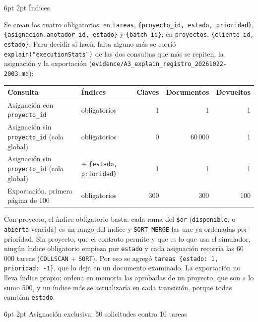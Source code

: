 \documentclass[10pt,letterpaper]{article}
\makeatletter
\newcommand{\ev}[1]{{\footnotesize\texttt{evidence/\allowbreak #1}}}
\renewcommand\subsection{\@startsection{subsection}{2}{\z@}%
  {6pt \@plus 1pt}{2pt}%
  {\normalfont\normalsize\bfseries\color{acc}}}
\makeatother
\begin{document}
\subsection{Índices}

Se crean los cuatro obligatorios: en \texttt{tareas}, \texttt{\{proyecto\_id, estado, prioridad\}},
\texttt{\{asignacion.anotador\_id, estado\}} y \texttt{\{batch\_id\}}; en \texttt{proyectos},
\texttt{\{cliente\_id, estado\}}. Para decidir si hacía falta alguno más se corrió
\texttt{explain("executionStats")} de las dos consultas que más se repiten, la asignación y la exportación
(\ev{A3\_explain\_registro\_20261022-2003.md}):

\begin{center}\small
\begin{tabular}{@{}llrrr@{}}
\toprule
Consulta & Índices & Claves & Documentos & Devueltos \\
\midrule
Asignación con \texttt{proyecto\_id} & obligatorios & 1 & 1 & 1 \\
Asignación sin \texttt{proyecto\_id} (cola global) & obligatorios & 0 & 60\,000 & 1 \\
Asignación sin \texttt{proyecto\_id} (cola global) & + \texttt{\{estado, prioridad\}} & 1 & 1 & 1 \\
Exportación, primera página de 100 & obligatorios & 300 & 300 & 100 \\
\bottomrule
\end{tabular}
\end{center}

Con proyecto, el índice obligatorio basta: cada rama del \texttt{\$or} (\texttt{disponible}, o
\texttt{abierta} vencida) es un rango del índice y \texttt{SORT\_MERGE} las une ya ordenadas por prioridad.
Sin proyecto, que el contrato permite y que es lo que usa el simulador, ningún índice obligatorio empieza
por \texttt{estado} y cada asignación recorría las 60\,000 tareas (\texttt{COLLSCAN} + \texttt{SORT}). Por
eso se agregó \texttt{tareas \{estado: 1, prioridad: -1\}}, que lo deja en un documento examinado. La
exportación no lleva índice propio: ordena en memoria las aprobadas de un proyecto, que son a lo sumo 500, y
un índice más se actualizaría en cada transición, porque todas cambian \texttt{estado}.

\subsection{Asignación exclusiva: 50 solicitudes contra 10 tareas}
\end{document}
